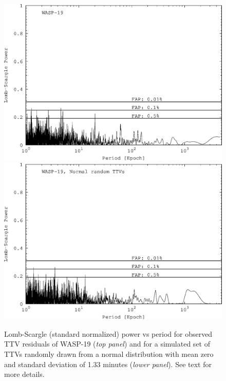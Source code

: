 \begin{figure}
\centering
\includegraphics[width=0.7\columnwidth]{imagenes/LS_WASP19_New_GIMP.png}
\includegraphics[width=0.7\columnwidth]{imagenes/LS_WASP19_NormRandom_New_GIMP.png}
\caption{Lomb-Scargle (standard normalized) power vs period for observed TTV residuals of WASP-19 (\emph{top
panel}) and for a simulated set of TTVs randomly drawn from a normal distribution with mean zero and standard
deviation of 1.33 minutes (\emph{lower panel}). See text for more details.}
\label{LS_wasp19_random}
\end{figure}


